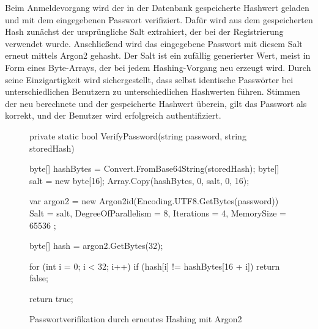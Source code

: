 Beim Anmeldevorgang wird der in der Datenbank gespeicherte Hashwert geladen und mit dem eingegebenen Passwort verifiziert. Dafür wird aus dem gespeicherten Hash zunächst der ursprüngliche Salt extrahiert, der bei der Registrierung verwendet wurde. Anschließend wird das eingegebene Passwort mit diesem Salt erneut mittels Argon2 gehasht.
Der Salt ist ein zufällig generierter Wert, meist in Form eines Byte-Arrays, der bei jedem Hashing-Vorgang neu erzeugt wird. Durch seine Einzigartigkeit wird sichergestellt, dass selbst identische Passwörter bei unterschiedlichen Benutzern zu unterschiedlichen Hashwerten führen. Stimmen der neu berechnete und der gespeicherte Hashwert überein, gilt das Passwort als korrekt, und der Benutzer wird erfolgreich authentifiziert.

\begin{figure}[H]
    \centering
    \begin{cs}
private static bool VerifyPassword(string password, string storedHash)
{
    byte[] hashBytes = Convert.FromBase64String(storedHash);
    byte[] salt = new byte[16];
    Array.Copy(hashBytes, 0, salt, 0, 16);

    var argon2 = new Argon2id(Encoding.UTF8.GetBytes(password))
    {
        Salt = salt,
        DegreeOfParallelism = 8,
        Iterations = 4,
        MemorySize = 65536
    };

    byte[] hash = argon2.GetBytes(32);

    for (int i = 0; i < 32; i++)
    {
        if (hash[i] != hashBytes[16 + i])
        {
            return false;
        }
    }

    return true;
}
\end{cs}
    \caption{Passwortverifikation durch erneutes Hashing mit Argon2}
\end{figure}